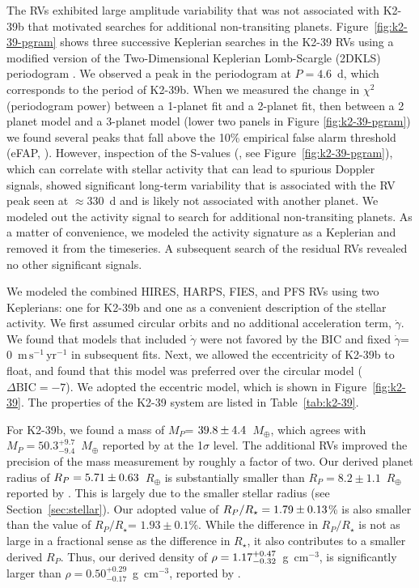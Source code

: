 \documentclass[preprint2]{aastex6}
\newcommand{\Rstar}{\ensuremath{R_{\star}}\xspace}
\newcommand{\Mp}{\ensuremath{M_{P}}\xspace}
\newcommand{\Rp}{\ensuremath{R_P}\xspace}
\newcommand{\msyr}{\ensuremath{\mathrm{m}\,\mathrm{s}^{-1}\,\mathrm{yr}^{-1}}\xspace}
\newcommand{\Me}{\ensuremath{M_{\oplus}}\xspace}
\renewcommand{\Re}{\ensuremath{R_{\oplus}}\xspace}
\newcommand{\gcc}{g~cm$^{-3}$\xspace}
\newcommand{\rrat}{\ensuremath{\Rp/\Rstar}\xspace}
\newcommand{\dvdt}{\ensuremath{\dot{\gamma}}\xspace}
\newcommand{\dbic}{\ensuremath{\Delta\mathrm{BIC}}\xspace}
\begin{document}
The RVs exhibited large amplitude variability that was not associated with K2-39b that motivated searches for additional non-transiting planets. Figure~\ref{fig:k2-39-pgram} shows three successive Keplerian searches in the K2-39 RVs using a modified version of the Two-Dimensional Keplerian Lomb-Scargle (2DKLS) periodogram \citep{Otoole09,Howard16}. We observed a peak in the periodogram at $P = 4.6$~d, which corresponds to the period of K2-39b. When we measured the change in $\chi^2$ (periodogram power) between a 1-planet fit and a 2-planet fit, then between a 2 planet model and a 3-planet model (lower two panels in Figure \ref{fig:k2-39-pgram}) we found several peaks that fall above the 10\% empirical false alarm threshold (eFAP, \citealt{Howard16}). However, inspection of the S-values  (\citealt{Isaacson10}, see Figure~\ref{fig:k2-39-pgram}), which can correlate with stellar activity that can lead to spurious Doppler signals, showed significant long-term variability that is associated with the RV peak seen at $\approx$330~d and is likely not associated with another planet. We modeled out the activity signal to search for additional non-transiting planets. As a matter of convenience, we modeled the activity signature as a Keplerian and removed it from the timeseries. A subsequent search of the residual RVs revealed no other significant signals.

We modeled the combined HIRES, HARPS, FIES, and PFS RVs using two Keplerians: one for K2-39b and one as a convenient description of the stellar activity. We first assumed circular orbits and no additional acceleration term, \dvdt. We found that models that included \dvdt were not favored by the BIC and fixed \dvdt = 0~\msyr in subsequent fits. Next, we allowed the eccentricity of K2-39b to float, and found that this model was preferred over the circular model ($\dbic = -7$). We adopted the eccentric model, which is shown in Figure~\ref{fig:k2-39}. The properties of the K2-39 system are listed in Table~\ref{tab:k2-39}. 

For K2-39b, we found a mass of \Mp = $\val{K2-39-ecc}{Mpsini1}$~\Me, which agrees with $\Mp = 50.3^{+9.7}_{-9.4}$~\Me reported by \cite{VanEylen16b} at the 1$\sigma$ level. The additional RVs improved the precision of the mass measurement by roughly a factor of two. Our derived planet radius of $\Rp = \val{K2-39-ecc}{Rp1}$~\Re is substantially smaller than $\Rp = 8.2\pm1.1$~\Re reported by \cite{VanEylen16b}. This is largely due to the smaller stellar radius (see Section~\ref{sec:stellar}). Our adopted value of $\rrat = \val{K2-39-circ}{rrat1}$\% is also smaller than the \cite{VanEylen16b} value of \rrat = $1.93 \pm 0.1$\%. While the difference in \rrat is not as large in a fractional sense as the difference in \Rstar, it also contributes to a smaller derived \Rp. Thus, our derived density of $\rho = \val{K2-39-ecc}{rhop1}$~\gcc, is significantly larger than $\rho = 0.50^{+0.29}_{-0.17}$~\gcc, reported by \cite{VanEylen16b}.
\end{document}
